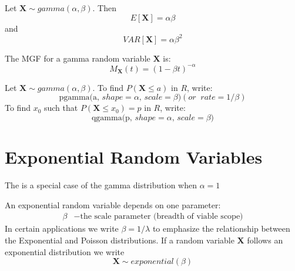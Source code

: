 \documentclass[12pt]{report}
\begin{document}
\begin{defn}{}{}
    Let $\mathbf{X}\sim gamma(\alpha,\beta)$. Then \begin{equation*}
        E[\mathbf{X}] = \alpha\beta
    \end{equation*}
    and
    \begin{equation*}
        VAR[\mathbf{X}] = \alpha\beta^2
    \end{equation*}
\end{defn}


\begin{defn}{}{}
    The MGF for a gamma random variable $\mathbf{X}$ is: \begin{equation*}
        M_{\mathbf{X}}(t) = (1-\beta t)^{-\alpha}
    \end{equation*}
\end{defn}


\begin{defn}{}{}
    Let $\mathbf{X}\sim gamma(\alpha,\beta)$. To find $P(\mathbf{X} \leq a)$ in $R$, write: \begin{equation*}
        \text{pgamma(a, $shape = \alpha$, $scale = \beta$)} (or\;\; rate = 1/\beta)
    \end{equation*}
    To find $x_0$ such that $P(\mathbf{X} \leq x_0) = p$ in $R$, write: \begin{equation*}
        \text{qgamma(p, $shape = \alpha$, $scale = \beta$)}
    \end{equation*}
\end{defn}


\section{Exponential Random Variables}

\begin{defn}{}{}
    The  is a special case of the gamma distribution when $\alpha = 1$
\end{defn}

\begin{defn}{}{}
    An exponential random variable depends on one parameter: \begin{align*}
        \beta &- \text{the scale parameter (breadth of viable scope)}
    \end{align*}
    In certain applications we write $\beta = 1/\lambda$ to emphasize the relationship between the Exponential and Poisson distributions. If a random variable $\mathbf{X}$ follows an exponential distribution we write $$\mathbf{X}\sim exponential(\beta)$$
\end{defn}
\end{document}
